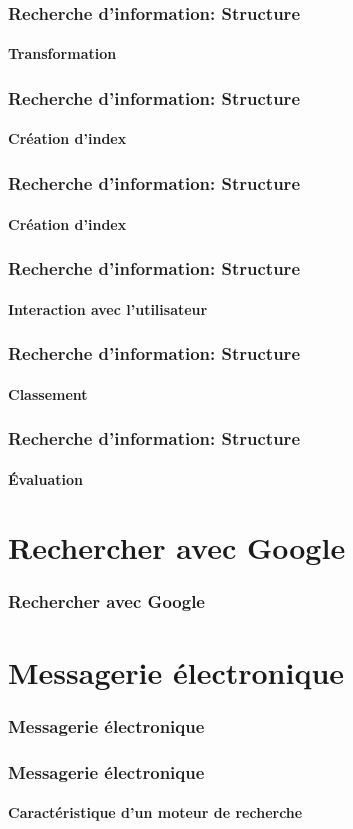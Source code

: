 \documentclass{beamer}
\begin{document}
\begin{frame}
\frametitle{Recherche d'information: Structure}
\framesubtitle{Transformation}

\end{frame}

\begin{frame}
\frametitle{Recherche d'information: Structure}
\framesubtitle{Création d'index}

\end{frame}

\begin{frame}
\frametitle{Recherche d'information: Structure}
\framesubtitle{Création d'index}

\end{frame}

\begin{frame}
\frametitle{Recherche d'information: Structure}
\framesubtitle{Interaction avec l'utilisateur}

\end{frame}

\begin{frame}
\frametitle{Recherche d'information: Structure}
\framesubtitle{Classement}

\end{frame}

\begin{frame}
\frametitle{Recherche d'information: Structure}
\framesubtitle{Évaluation}

\end{frame}

\section{Rechercher avec Google}

\begin{frame}
\frametitle{Rechercher avec Google}

\end{frame}

\section{Messagerie électronique}

\begin{frame}
\frametitle{Messagerie électronique}

\end{frame}

\begin{frame}
\frametitle{Messagerie électronique}
\framesubtitle{Caractéristique d'un moteur de recherche}

\end{frame}
\end{document}
